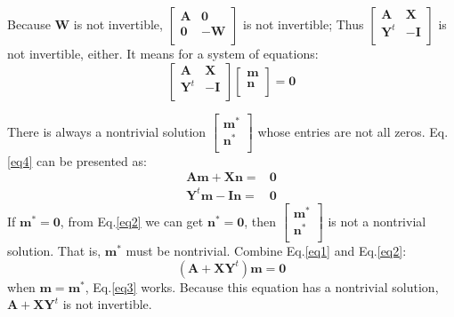 \documentclass[22pt]{article}
\begin{document}
	Because $\mathbf{W}$ is not invertible, $ \left[ \begin{array}{cc}
			 \mathbf{A} & \mathbf{0} \\
			 \mathbf{0} & -\mathbf{W}  \\
			 \end{array} \right]$ is not invertible; Thus  $\left[ \begin{array}{cc}
			 \mathbf{A} & \mathbf{X} \\
			 \mathbf{Y}^t & \mathbf{-I} \\
			 \end{array} \right]$ is not invertible, either. It means for a system of equations:
		\begin{equation}
			\left[ \begin{array}{cc}
			 \mathbf{A} & \mathbf{X} \\
			 \mathbf{Y}^t & \mathbf{-I} \\
			 \end{array} \right]\left[ \begin{array}{c}
			 \mathbf{m}\\
			 \mathbf{n} \\
			 \end{array} \right] = \mathbf{0}\label{eq4}
		\end{equation}

		There is always a nontrivial solution $\left[ \begin{array}{c}
			 \mathbf{m}^*\\
			 \mathbf{n}^* \\
			 \end{array} \right]$ whose entries are not all zeros. Eq.\ref{eq4} can be presented as:
			 \begin{align}
			 	\mathbf{Am} + \mathbf{Xn} = & \mathbf{0} \label{eq1}\\ 	
			 	\mathbf{Y}^t\mathbf{m} - \mathbf{In} = & \mathbf{0}
			 	\label{eq2}
			 \end{align}
		If $\mathbf{m}^* = \mathbf{0}$, from Eq.\ref{eq2} we can get $\mathbf{n}^* = \mathbf{0}$, then $\left[ \begin{array}{c}
			 \mathbf{m}^*\\
			 \mathbf{n}^* \\
			 \end{array} \right]$ is not a nontrivial solution. That is, $\mathbf{m}^*$ must be nontrivial. Combine Eq.\ref{eq1} and Eq.\ref{eq2}:
			 \begin{equation}
			 	(\mathbf{A}+\mathbf{XY}^t)\mathbf{m} = \mathbf{0}\label{eq3}
			 \end{equation}
		when $\mathbf{m} = \mathbf{m}^*$, Eq.\ref{eq3} works. Because this equation has a nontrivial solution, $\mathbf{A}+\mathbf{XY}^t$ is not invertible.
\end{document}
